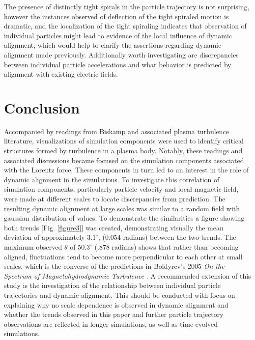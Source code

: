 \documentclass[journal, a4paper]{IEEEtran}
\begin{document}
The presence of distinctly tight spirals in the particle trajectory is not surprising, however the instances observed of deflection of the tight spiraled motion is dramatic, and the localization of the tight spiraling indicates that observation of individual particles might lead to evidence of the local influence of dynamic alignment, which would help to clarify the assertions regarding dynamic alignment made previously. Additionally worth investigating are discrepancies between individual particle accelerations and what behavior is predicted by alignment with existing electric fields.

\vspace{.4cm}
\section{Conclusion}
\vspace{.4cm}

	Accompanied by readings from Biskamp\cite{biskamp} and associated plasma turbulence literature\cite{boldyrev}\cite{chandran}, visualizations of simulation components were used to identify critical structures formed by turbulence in a plasma body. Notably, these readings and associated discussions became focused on the simulation components associated with the Lorentz force. These components in turn led to an interest in the role of dynamic alignment in the simulations. To investigate this correlation of simulation components, particularly particle velocity and local magnetic field, were made at different scales to locate discrepancies from prediction. The resulting dynamic alignment at large scales was similar to a random field with gaussian distribution of values. To demonstrate the similarities a figure showing both trends [Fig. \ref{figure3}] was created, demonstrating visually the mean deviation of approximately $3.1^{\circ}$, ($0.054$ radians) between the two trends. The maximum observed $\theta$ of $50.3^{\circ}$ ($.878$ radians) shows that rather than becoming aligned, fluctuations tend to become more perpendicular to each other at small scales, which is the converse of the predictions in Boldyrev's 2005 \textit{On the Spectrum of Magnetohydrodynamic Turbulence} \cite{boldyrev2}.
A recommended extension of this study is the investigation of the relationship between individual particle trajectories and dynamic alignment. This should be conducted with focus on explaining why no scale dependence is observed in dynamic alignment and whether the trends observed in this paper and further particle trajectory observations are reflected in longer simulations, as well as time evolved simulations.
\end{document}
